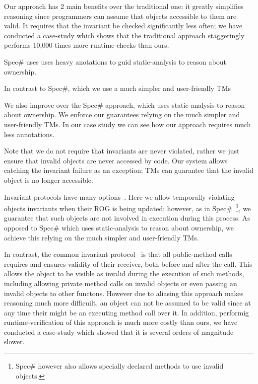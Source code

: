 Our approach has 2 main benefits over the traditional one: it greatly simplifies reasoning since programmers can assume that objects accessible to them are valid. %
It requires that the invariant be checked significantly less often; we have conducted a case-study which shows that the traditional approach staggeringly performs 10,000 times more runtime-checks than ours.

Spec\# uses uses heavy anotations to guid static-analysis to reason about ownership.

In contrast to Spec\#, which we use a much simpler and user-friendly TMs

We also improve over the Spec\# approach, which uses static-analysis to reason about ownership. We enforce our guarantees relying on the much simpler and user-friendly TMs. In our case study we can see how our approach requires much less annotations.

Note that we do not require that invariants are never violated, rather we just ensure that invalid objects are never accessed by code. Our system allows catching the invariant failure as an exception; TMs can guarantee that the invalid object is no longer accessible.

Invariant protocols have many options~\cite{FlexibleInvariants}. Here we allow temporally violating
objects invariants when their ROG is being updated; however, as in Spec\#~\cite{TODO}\footnote{Spec\# 
however also allows specially declared methods to use invalid objects.}, we guarantee that such objects are not involved in execution during this process. As opposed to Spec\# which uses static-analysis to reason about ownership, we achieve this relying on the much simpler and user-friendly TMs.

In contrast, the common invariant protocol~\cite{JML, OOSC..., D, Eiffel} is that all public-method calls requires and ensures validity of their receiver, both before and after the call. This allows the object to be visible as invalid during the execution of such methods, including allowing private method calls on invalid objects or even passing an invalid objects to other functons. However due to aliasing this approach makes reasoning much more difficuilt, an object can not be assumed to be valid since at any time their might be an executing method call over it. In addition, performig runtime-verification of this approach is much more costly than ours, we have conducted a case-study which showed that it is several orders of magnitude slower.



